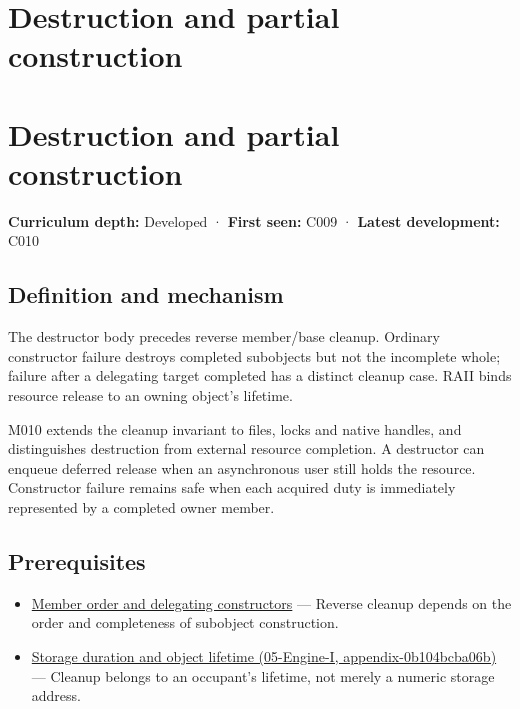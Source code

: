 \hypertarget{appendix-9bfe377cef7a}{}
\section*{Destruction and partial construction}
\section{Destruction and partial construction}\label{appendix-9bfe377cef7a-destruction-and-partial-construction}

\textbf{Curriculum depth:} Developed · \textbf{First seen:} C009 · \textbf{Latest development:} C010

\subsection{Definition and mechanism}\label{appendix-9bfe377cef7a-definition-and-mechanism}

The destructor body precedes reverse member/base cleanup. Ordinary constructor failure destroys completed subobjects but not the incomplete whole; failure after a delegating target completed has a distinct cleanup case. RAII binds resource release to an owning object's lifetime.

M010 extends the cleanup invariant to files, locks and native handles, and distinguishes destruction from external resource completion. A destructor can enqueue deferred release when an asynchronous user still holds the resource. Constructor failure remains safe when each acquired duty is immediately represented by a completed owner member.

\subsection{Prerequisites}\label{appendix-9bfe377cef7a-prerequisites}

\begin{itemize}
\tightlist
\item
  \hyperref[appendix-3cb49709605a]{Member order and delegating constructors} --- Reverse cleanup depends on the order and completeness of subobject construction.
\item
  \href{../05-Engine-I/main.pdf\#nameddest=appendix-0b104bcba06b}{Storage duration and object lifetime (05-Engine-I, appendix-0b104bcba06b)} --- Cleanup belongs to an occupant's lifetime, not merely a numeric storage address.
\end{itemize}

